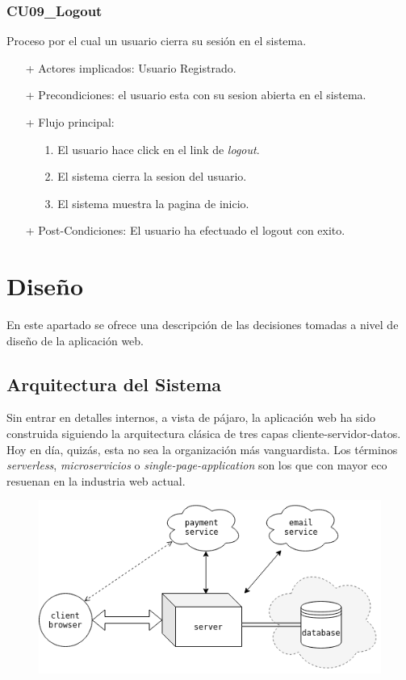 \documentclass[a4paper]{report}
\begin{document}
            \subsubsection{CU09\_Logout}
                Proceso por el cual un usuario cierra su sesi\'on en el sistema.
                \begin{itemize}
                    \item[+] Actores implicados: Usuario Registrado.
                    \item[+] Precondiciones: el usuario esta con su sesion abierta en el sistema.
                    \item[+] Flujo principal:
                    \begin{enumerate}
                        \item[1.] El usuario hace click en el link de \emph{logout}.
                        \item[2.] El sistema cierra la sesion del usuario.
                        \item[3.] El sistema muestra la pagina de inicio.
                    \end{enumerate}
                    \item[+] Post-Condiciones: El usuario ha efectuado el logout con exito.
                \end{itemize}


    \section{Diseño}
    En este apartado se ofrece una descripción de las decisiones tomadas a nivel de diseño de la aplicación web.
    \subsection{Arquitectura del Sistema}
    Sin entrar en detalles internos, a vista de pájaro, la aplicación web ha sido construida siguiendo la arquitectura clásica de tres capas cliente-servidor-datos. Hoy en día, quizás, esta no sea la organización más vanguardista. Los términos \emph{serverless}, \emph{microservicios} o \emph{single-page-application} son los que con mayor eco resuenan en la industria web actual.
    
    \begin{figure}[h]
    	\centering
    	\includegraphics[width=\textwidth]{desing_diagram}
    \end{figure}
    
\end{document}
